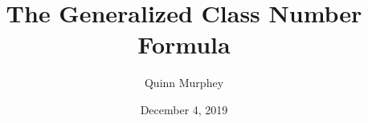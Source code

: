 \documentclass[12pt]{beamer}
\title[Class Number Formula]{The Generalized Class Number Formula}
\author[Quinn Murphey]{Quinn Murphey}
\date[]{December 4, 2019}
\begin{document}
 
\frame{\titlepage}

\begin{frame}{}
    
\end{frame}
\end{document}
